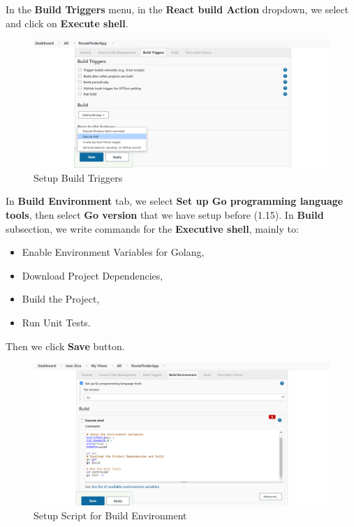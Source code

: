 \documentclass[12pt,a4paper,twoside]{article}
\begin{document}
In the \textbf{Build Triggers} menu, in the \textbf{React build Action} dropdown, we select and click on \textbf{Execute shell}.


\begin{figure}[H]
    \centering
        \includegraphics[width=15cm]{images-aws/35-jenkins-build-setup.png}
        \caption{Setup Build Triggers}
\end{figure}


In \textbf{Build Environment} tab, we select \textbf{Set up Go programming language tools}, then select \textbf{Go version} that we have setup before (1.15).
In \textbf{Build} subsection, we write commands for the \textbf{Executive shell}, mainly to:


\begin{itemize}
	\item Enable Environment Variables for Golang, 
	\item Download Project Dependencies,
	\item Build the Project,
	\item Run Unit Tests.
\end{itemize}


Then we click \textbf{Save} button.


\begin{figure}[H]
    \centering
        \includegraphics[width=15cm]{images-aws/36-project-build-env-golang-.png}
        \caption{Setup Script for Build Environment}
\end{figure}
\end{document}
